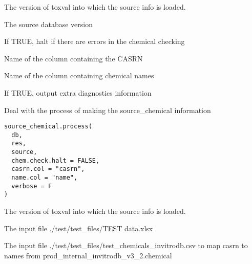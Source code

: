 \documentclass[letterpaper]{book}
\begin{document}
%
\begin{Arguments}
\begin{ldescription}
\item[\code{toxval.db}] The version of toxval into which the source info is loaded.

\item[\code{source.db}] The source database version

\item[\code{chem.check.halt}] If TRUE, halt if there are errors in the chemical checking

\item[\code{casrn.col}] Name of the column containing the CASRN

\item[\code{name.col}] Name of the column containing chemical names

\item[\code{verbose}] If TRUE, output extra diagnostics information
\end{ldescription}
\end{Arguments}
%
\begin{Description}\relax
Deal with the process of making the source\_chemical information
\end{Description}
%
\begin{Usage}
\begin{verbatim}
source_chemical.process(
  db,
  res,
  source,
  chem.check.halt = FALSE,
  casrn.col = "casrn",
  name.col = "name",
  verbose = F
)
\end{verbatim}
\end{Usage}
%
\begin{Arguments}
\begin{ldescription}
\item[\code{db}] The version of toxval into which the source info is loaded.

\item[\code{infile1}] The input file ./test/test\_files/TEST data.xlsx

\item[\code{infile2}] The input file ./test/test\_files/test\_chemicals\_invitrodb.csv to map casrn to names from prod\_internal\_invitrodb\_v3\_2.chemical
\end{ldescription}
\end{Arguments}
\end{document}
